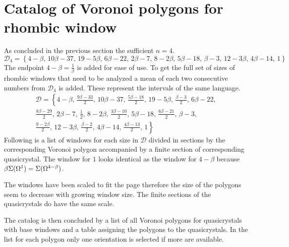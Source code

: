 \documentclass[text.tex]{subfiles}
\begin{document}
\section{Catalog of Voronoi polygons for rhombic window}
As concluded in the previous section the sufficient $n=4$. 
$$\mathcal{D}_4 = \left\{4-\beta,\, 10\beta-37,\, 19-5\beta,\, 6\beta-22,\, 2\beta-7,\, 8-2\beta,\, 5\beta-18,\, \beta-3,\, 12-3\beta,\, 4\beta-14,\, 1\right\}$$
The endpoint $4-\beta = \frac{1}{\beta}$ is added for ease of use. To get the full set of sizes of rhombic windows that need to be analyzed a mean of each two consecutive numbers from $\mathcal{D}_4$ is added. These represent the intervals of the same language. 
\begin{multline*}
\mathcal{D} = \left\{4-\beta,\, \frac{9\beta-33}{2},\, 10\beta-37,\, \frac{5\beta-18}{2},\, 19-5\beta,\, \frac{\beta-3}{2},\, 6\beta-22,\, \right. \\
\frac{8\beta-29}{2},\, 2\beta-7,\, \frac{1}{2},\, 8-2\beta,\, \frac{3\beta-10}{2},\,  5\beta-18,\, \frac{6\beta-21}{2},\, \beta-3,\, \\
\left. \frac{9-2\beta}{2},\, 12-3\beta,\, \frac{\beta-2}{2},\, 4\beta-14,\, \frac{4\beta-13}{2},\, 1\right\}
\end{multline*}
Following is a list of windows for each size in $\mathcal{D}$ divided in sections by the corresponding Voronoi polygon accompanied by a finite section of corresponding quasicrystal. The window for $1$ looks identical as the window for $4-\beta$ because $\beta\Sigma(\Omega^1)=\Sigma(\Omega^{4-\beta})$.

The windows have been scaled to fit the page therefore the size of the polygons seem to decrease with growing window size. The finite sections of the quasicrystals do have the same scale.

The catalog is then concluded by a list of all Voronoi polygons for quasicrystals with base windows and a table assigning the polygons to the quasicrystals. In the list for each polygon only one orientation is selected if more are available. 
\end{document}
